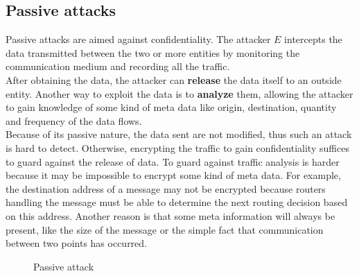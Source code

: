 \subsection{Passive attacks}
Passive attacks are aimed against confidentiality. The attacker $E$ intercepts the data transmitted between the two or more entities by monitoring the communication
medium and recording all the traffic. 
\\
After obtaining the data, the attacker can \textbf{release} the data itself to an outside entity. Another way to exploit the data is to \textbf{analyze} them,
allowing the attacker to gain knowledge of some kind of meta data like origin, destination, quantity and frequency of the data flows. 
\\
Because of its passive nature, the data sent are not modified, thus such an attack is hard to detect. Otherwise, encrypting the traffic to gain confidentiality suffices to guard
against the release of data. To guard against traffic analysis is harder because it may be impossible to encrypt some kind of meta data. For example, the destination address of a
message may not be encrypted because routers handling the message must be able to determine the next routing decision based on this address.
Another reason is that some meta information will always be present, like the size of the message or the simple fact that communication between two points has occurred.
\begin{figure}[h]
\centering
{}
\label{fig:passAttack}
\caption{Passive attack}
\end{figure}
